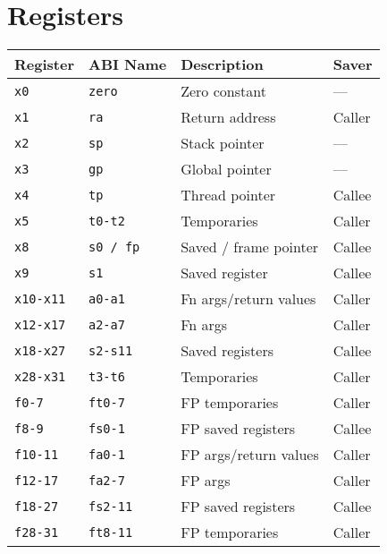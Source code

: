 \section*{Registers}

\begin{tabular} {l | l | l | l} \hline
Register     & ABI Name     & Description           & Saver  \\ \hline
\tt{x0}      & \tt{zero}    & Zero constant         & ---    \\
\tt{x1}      & \tt{ra}      & Return address        & Caller \\
\tt{x2}      & \tt{sp}      & Stack pointer         & ---    \\
\tt{x3}      & \tt{gp}      & Global pointer        & ---    \\
\tt{x4}      & \tt{tp}      & Thread pointer        & Callee \\
\tt{x5}      & \tt{t0-t2}   & Temporaries           & Caller \\
\tt{x8}      & \tt{s0 / fp} & Saved / frame pointer & Callee \\
\tt{x9}      & \tt{s1}      & Saved register        & Callee \\
\tt{x10-x11} & \tt{a0-a1}   & Fn args/return values & Caller \\
\tt{x12-x17} & \tt{a2-a7}   & Fn args               & Caller \\
\tt{x18-x27} & \tt{s2-s11}  & Saved registers       & Callee \\
\tt{x28-x31} & \tt{t3-t6}   & Temporaries           & Caller \\ \hline
\tt{f0-7}    & \tt{ft0-7}   & FP temporaries        & Caller \\
\tt{f8-9}    & \tt{fs0-1}   & FP saved registers    & Callee \\
\tt{f10-11}  & \tt{fa0-1}   & FP args/return values & Caller \\
\tt{f12-17}  & \tt{fa2-7}   & FP args               & Caller \\
\tt{f18-27}  & \tt{fs2-11}  & FP saved registers    & Callee \\
\tt{f28-31}  & \tt{ft8-11}  & FP temporaries        & Caller \\ \hline
\end{tabular}